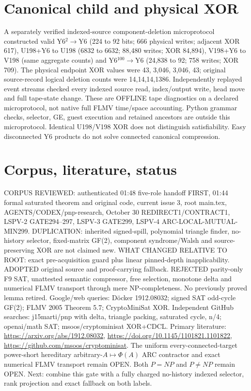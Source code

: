 \documentclass[11pt]{article}
\begin{document}
\section{Canonical child and physical XOR}
A separately verified indexed-source component-deletion microprotocol constructed valid Y6$^2\to$Y6 (224 to 92 bits; 666 physical writes; adjacent XOR 617), U198+Y6 to U198 (6832 to 6632; 88,480 writes; XOR 84,894), V198+Y6 to V198 (same aggregate counts) and Y6$^{100}\to$Y6 (24,838 to 92; 758 writes; XOR 709). The physical endpoint XOR values were 43, 3,046, 3,046, 43; original source-record logical deletion counts were 14,14,14,1386. Independently replayed event streams checked every indexed source read, index/output write, head move and full tape-state change. These are OFFLINE tape diagnostics on a declared microprotocol, not native full FLMV time/space accounting. Python grammar checks, selector, GE, guest execution and retained ancestors are outside this microprotocol. Identical U198/V198 XOR does not distinguish satisfiability. Easy disconnected Y6 products do not solve connected canonical compression.
\section{Corpus, literature, status}
CORPUS REVIEWED: authenticated 01:48 five-role handoff FIRST, 01:44 formal saturated theorem and original code, current issue 3, root main.tex, AGENTS/CODEX/pnp-research, October 30 REDIRECT1/CONTRACT1, LSPV-2 GATE294--297, LSPV-3 GATE299, LSPV-4 ARC-LOCAL-MUTUAL-MIN299. DUPLICATION: inherited signed-spill, polynomial triangle finder, no-history selector, fixed-matrix GF(2), component syndrome/Walsh and source-preserving XOR are not claimed new. WHAT CHANGED RELATIVE TO ROOT: exact pre-acquisition guard plus linear pinned-depth inapplicability. ADOPTED original source and proof-carrying fallback. REJECTED parity-only F9 SAT, unattested semantic compressor, free selection, monotone delta and numerical FLMV transport through mere NP-completeness. No previously proved lemma retired.
Google/web queries: D\"ocker 1912.08032; signed SAT odd-cycle GF(2); FLMV 2005 Theorem 5.7; CryptoMiniSat XOR. Independent GitHub searches: j15marti/pnp with delta, triangle packing, saturated cycle, n/4; openai/math SAT; msoos/cryptominisat XOR+CDCL. Primary literature: \url{https://arxiv.org/abs/1912.08032}, \url{https://doi.org/10.1145/1101821.1101822}, \url{https://github.com/msoos/cryptominisat}. The uniform every-connected-target power-short hereditary arbitrary-$A\mapsto\Phi(A)$ ARC contractor and exact numerical FLMV transport remain OPEN. Both $P=NP$ and $P\ne NP$ remain OPEN. Next: combine this gate with a fully charged no-history indexed selector, rank projection and exact fallback on both labels.
\end{document}
